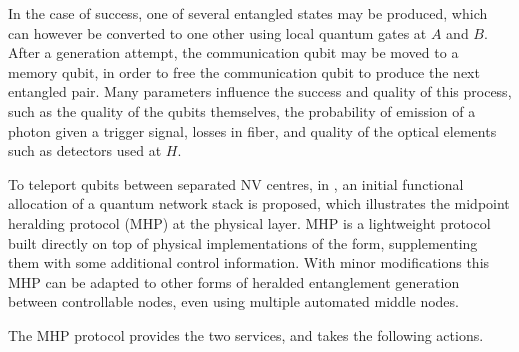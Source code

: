 \documentclass[10pt]{article}
\begin{document}
In the case of success, one of several entangled states may be produced, which can however be converted to one other using local quantum gates at $A$ and $B$. After a generation attempt, the communication qubit may be moved to a memory qubit, in order to free the communication qubit to produce the next entangled pair. Many parameters influence the success and quality of this process, such as the quality of the qubits themselves, the probability of emission of a photon given a trigger signal, losses in fiber, and quality of the optical elements such as detectors used at $H$.

To teleport qubits between separated NV centres,
in \cite{dahlberg2019link}, an initial functional allocation of a quantum network stack is proposed, which illustrates the midpoint heralding protocol (MHP) at the physical layer. MHP is a lightweight protocol built directly on top of physical implementations of the form, supplementing them with some additional control information.
With minor modifications this MHP can be adapted to other forms of heralded entanglement generation between controllable nodes, even using multiple automated middle nodes.


The MHP protocol provides the two services, and takes the following actions.
\end{document}
